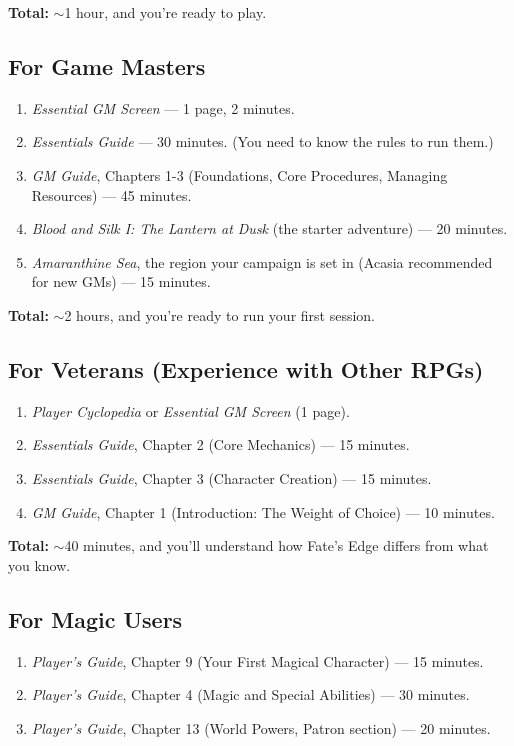 \documentclass[10pt]{article}
\begin{document}
\textbf{Total:} $\sim$1 hour, and you're ready to play.

\subsection*{For Game Masters}

\begin{enumerate}
\item \textit{Essential GM Screen} --- 1 page, 2 minutes.
\item \textit{Essentials Guide} --- 30 minutes. (You need to know the rules to run them.)
\item \textit{GM Guide}, Chapters 1-3 (Foundations, Core Procedures, Managing Resources) --- 45 minutes.
\item \textit{Blood and Silk I: The Lantern at Dusk} (the starter adventure) --- 20 minutes.
\item \textit{Amaranthine Sea}, the region your campaign is set in (Acasia recommended for new GMs) --- 15 minutes.
\end{enumerate}

\textbf{Total:} $\sim$2 hours, and you're ready to run your first session.

\subsection*{For Veterans (Experience with Other RPGs)}

\begin{enumerate}
\item \textit{Player Cyclopedia} or \textit{Essential GM Screen} (1 page).
\item \textit{Essentials Guide}, Chapter 2 (Core Mechanics) --- 15 minutes.
\item \textit{Essentials Guide}, Chapter 3 (Character Creation) --- 15 minutes.
\item \textit{GM Guide}, Chapter 1 (Introduction: The Weight of Choice) --- 10 minutes.
\end{enumerate}

\textbf{Total:} $\sim$40 minutes, and you'll understand how Fate's Edge differs from what you know.

\subsection*{For Magic Users}

\begin{enumerate}
\item \textit{Player's Guide}, Chapter 9 (Your First Magical Character) --- 15 minutes.
\item \textit{Player's Guide}, Chapter 4 (Magic and Special Abilities) --- 30 minutes.
\item \textit{Player's Guide}, Chapter 13 (World Powers, Patron section) --- 20 minutes.
\end{enumerate}
\end{document}
